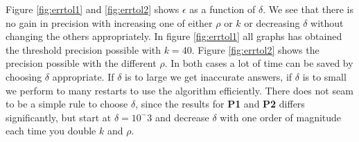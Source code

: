 
Figure \ref{fig:errtol1} and \ref{fig:errtol2} shows $\epsilon$ as a function of $\delta$. We see that there is no gain in precision with increasing one of either $\rho$ or $k$ or decreasing $\delta$ without changing the others appropriately. In figure \ref{fig:errtol1} all graphs has obtained the threshold precision possible with $k=40$. 
Figure \ref{fig:errtol2} shows the precision possible with the different $\rho$. In both cases a lot of time can be saved by choosing $\delta$ appropriate. If $\delta$ is to large we get inaccurate answers, if $\delta$ is to small we perform to many restarts to use the algorithm efficiently. There does not seam to be a simple rule to choose $\delta$, since the results for \textbf{P1} and \textbf{P2} differs significantly, but start at $\delta=10^-3$ and decrease $\delta$ with one order of magnitude each time you double $k$ and $\rho$. \\

